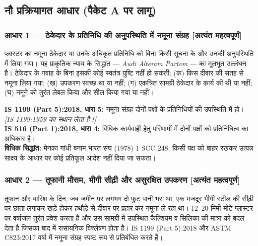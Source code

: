 \documentclass[12pt, a4paper]{article}
\begin{document}
\subsection{नौ प्रक्रियागत आधार (पैकेट A पर लागू)}

\subsubsection{आधार 1 --- ठेकेदार के प्रतिनिधि की अनुपस्थिति में नमूना संग्रह \textbf{[अत्यंत महत्वपूर्ण]}}

\begin{groundbox}
प्लास्टर का नमूना ठेकेदार या उनके अधिकृत प्रतिनिधि को बिना किसी सूचना के और उनकी अनुपस्थिति में लिया गया। यह प्राकृतिक न्याय के सिद्धांत --- \textit{Audi Alteram Partem} --- का मूलभूत उल्लंघन है। ठेकेदार के गवाह के बिना इसकी कोई स्वतंत्र पुष्टि नहीं हो सकती: (क) किस दीवार की सतह से नमूना लिया गया; (ख) उपकरण स्वच्छ था या नहीं; (ग) एकत्रित सामग्री ठेकेदार के कार्य की थी या नहीं; (घ) नमूने को तुरंत लेबल किया और सील किया गया या नहीं।
\end{groundbox}

\begin{standardbox}
\textbf{IS 1199 (Part 5):2018, धारा 5:} नमूना संग्रह दोनों पक्षों के प्रतिनिधियों की उपस्थिति में हो। \textit{[IS 1199:1959 का स्थान लेता है।]}\\
\textbf{IS 516 (Part 1):2018, धारा 4:} विधिक कार्यवाही हेतु परिणामों में दोनों पक्षों को प्रतिनिधित्व का अधिकार है।\\
\textbf{विधिक सिद्धांत:} मेनका गांधी बनाम भारत संघ (1978) 1 SCC 248: किसी पक्ष को बाहर रखकर उत्पन्न साक्ष्य के आधार पर कोई प्रतिकूल आदेश नहीं दिया जा सकता।
\end{standardbox}

\subsubsection{आधार 2 --- तूफानी मौसम, भीगी सीढ़ी और असुरक्षित उपकरण \textbf{[अत्यंत महत्वपूर्ण]}}

\begin{groundbox}
तूफान और बारिश के दिन, जब जमीन पर लगभग दो फुट पानी भरा था, एक मजदूर भीगी स्टील की सीढ़ी पर छाता लगाकर खड़े होकर हथौड़े से दीवार पर प्रहार कर नमूना ले रहा था। 12--20 मिमी मोटे प्लास्टर पर वर्षाजल तुरंत प्रवेश करता है और उस सामग्री में उपस्थित कैल्शियम व सिलिका की मात्रा को बदल देता है जिसका बाद में रासायनिक विश्लेषण होता है। IS 1199 (Part 5):2018 और ASTM C823:2017 वर्षा में नमूना संग्रह स्पष्ट रूप से प्रतिबंधित करते हैं।
\end{groundbox}
\end{document}
